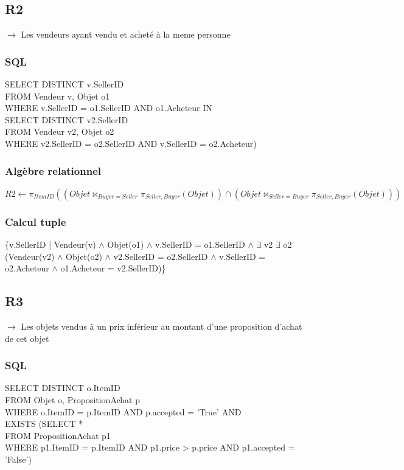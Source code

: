 \documentclass[a4paper,11pt]{article}
\begin{document}
\subsection{R2}
$\rightarrow$ Les vendeurs ayant vendu et acheté à la meme personne

\subsubsection{SQL}

SELECT DISTINCT v.SellerID\\
FROM Vendeur v, Objet o1\\
WHERE v.SellerID = o1.SellerID AND o1.Acheteur IN\\
\indent \indent SELECT DISTINCT v2.SellerID\\
\indent \indent FROM Vendeur v2, Objet o2\\
\indent \indent WHERE v2.SellerID = o2.SellerID AND v.SellerID = o2.Acheteur)
    
\subsubsection{Algèbre relationnel}

$R2 \leftarrow \pi_{ItemID}((Objet \bowtie_{Buyer=Seller} \pi_{Seller,Buyer}(Objet)) 
			    \cap (Objet \bowtie_{Seller=Buyer} \pi_{Seller,Buyer}(Objet)))$

\subsubsection{Calcul tuple}

\{v.SellerID | Vendeur(v) $\land$ Objet(o1) $\land$ v.SellerID = o1.SellerID $\land$ $\exists$ v2 $\exists$ o2 (Vendeur(v2) $\land$ Objet(o2) $\land$ v2.SellerID = o2.SellerID $\land$ v.SellerID = o2.Acheteur $\land$ o1.Acheteur = v2.SellerID)\}


\subsection{R3}

$\rightarrow$ Les objets vendus à un prix inférieur au montant d'une proposition d'achat de cet objet

\subsubsection{SQL}

SELECT DISTINCT o.ItemID\\
FROM Objet o, PropositionAchat p\\
WHERE o.ItemID = p.ItemID AND p.accepted = 'True' AND\\
\indent \indent EXISTS (SELECT *\\
\indent \indent FROM PropositionAchat p1\\
\indent \indent WHERE p1.ItemID = p.ItemID AND p1.price > p.price AND p1.accepted = 'False')
        
\end{document}
